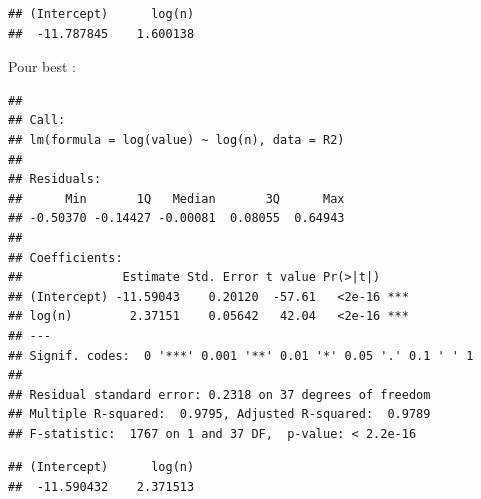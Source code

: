 \documentclass[
]{article}
\newenvironment{Shaded}{\begin{snugshade}}{\end{snugshade}}
\newcommand{\AttributeTok}[1]{\textcolor[rgb]{0.77,0.63,0.00}{#1}}
\newcommand{\DecValTok}[1]{\textcolor[rgb]{0.00,0.00,0.81}{#1}}
\newcommand{\FunctionTok}[1]{\textcolor[rgb]{0.00,0.00,0.00}{#1}}
\newcommand{\NormalTok}[1]{#1}
\newcommand{\OtherTok}[1]{\textcolor[rgb]{0.56,0.35,0.01}{#1}}
\newcommand{\SpecialCharTok}[1]{\textcolor[rgb]{0.00,0.00,0.00}{#1}}
\newcommand{\StringTok}[1]{\textcolor[rgb]{0.31,0.60,0.02}{#1}}
\begin{document}
\begin{Shaded}
\end{Shaded}

\begin{verbatim}
## (Intercept)      log(n) 
##  -11.787845    1.600138
\end{verbatim}

Pour best :

\begin{Shaded}
\end{Shaded}

\begin{verbatim}
## 
## Call:
## lm(formula = log(value) ~ log(n), data = R2)
## 
## Residuals:
##      Min       1Q   Median       3Q      Max 
## -0.50370 -0.14427 -0.00081  0.08055  0.64943 
## 
## Coefficients:
##              Estimate Std. Error t value Pr(>|t|)    
## (Intercept) -11.59043    0.20120  -57.61   <2e-16 ***
## log(n)        2.37151    0.05642   42.04   <2e-16 ***
## ---
## Signif. codes:  0 '***' 0.001 '**' 0.01 '*' 0.05 '.' 0.1 ' ' 1
## 
## Residual standard error: 0.2318 on 37 degrees of freedom
## Multiple R-squared:  0.9795, Adjusted R-squared:  0.9789 
## F-statistic:  1767 on 1 and 37 DF,  p-value: < 2.2e-16
\end{verbatim}

\begin{Shaded}
\end{Shaded}

\begin{verbatim}
## (Intercept)      log(n) 
##  -11.590432    2.371513
\end{verbatim}
\end{document}
